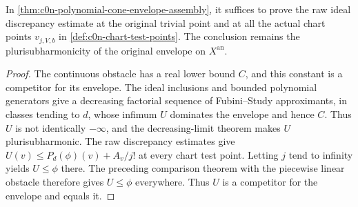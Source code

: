 \begin{theorem}
\label{thm:c0n-polynomial-chart-envelope-assembly}
\leanok
In \cref{thm:c0n-polynomial-cone-envelope-assembly}, it suffices to prove
the raw ideal discrepancy estimate at the original trivial point and at
all the actual chart points $v_{j,V,b}$ in
\cref{def:c0n-chart-test-points}.  The conclusion remains the
plurisubharmonicity of the original envelope on $X^{\mathrm{an}}$.
\end{theorem}
\begin{proof}
The continuous obstacle has a real lower bound $C$, and this constant is
a competitor for its envelope.  The ideal inclusions and bounded
polynomial generators give a decreasing factorial sequence of
Fubini--Study approximants, in classes tending to $d$, whose infimum $U$
dominates the envelope and hence $C$.  Thus $U$ is not identically
$-\infty$, and the decreasing-limit theorem makes $U$ plurisubharmonic.
The raw discrepancy estimates give
$U(v)\le P_d(\phi)(v)+A_v/j!$ at every chart test point.
Letting $j$ tend to infinity yields $U\le\phi$ there.
The preceding comparison theorem with the piecewise linear obstacle
therefore gives $U\le\phi$ everywhere.  Thus $U$ is a competitor for the
envelope and equals it.
\end{proof}
